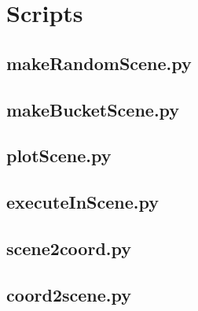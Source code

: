 \documentclass[dissertation.tex]{subfiles}
\begin{document}
\section{Scripts}
\subsection{makeRandomScene.py}

\subsection{makeBucketScene.py}

\subsection{plotScene.py}

\subsection{executeInScene.py}

\subsection{scene2coord.py}

\subsection{coord2scene.py}

\end{document}

